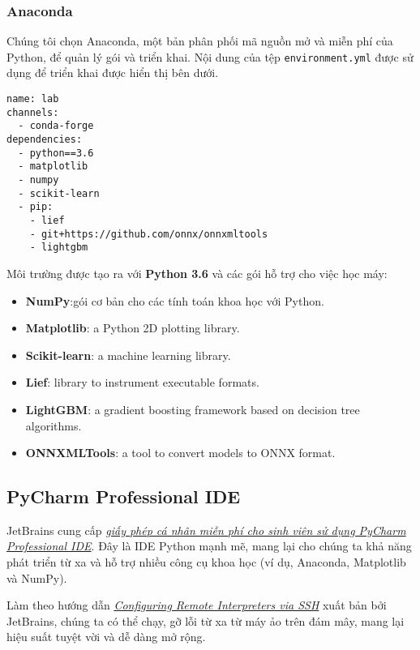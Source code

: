 \subsubsection{Anaconda}

Chúng tôi chọn Anaconda, một bản phân phối mã nguồn mở và miễn phí của Python, để quản lý gói và triển khai. Nội dung của tệp \verb|environment.yml| được sử dụng để triển khai được hiển thị bên dưới. 

\begin{lstlisting}
name: lab
channels:
  - conda-forge
dependencies:
  - python==3.6
  - matplotlib
  - numpy
  - scikit-learn
  - pip:
    - lief
    - git+https://github.com/onnx/onnxmltools
    - lightgbm
\end{lstlisting}

Môi trường được tạo ra với \textbf{Python 3.6} và các gói hỗ trợ cho việc học máy:

\begin{itemize}
\item \textbf{NumPy}:gói cơ bản cho các tính toán khoa học với Python.
\item \textbf{Matplotlib}: a Python 2D plotting library.
\item \textbf{Scikit-learn}: a machine learning library.
\item \textbf{Lief}: library to instrument executable formats.
\item \textbf{LightGBM}: a gradient boosting framework based on decision tree algorithms.
\item \textbf{ONNXMLTools}: a tool to convert models to ONNX format.
\end{itemize}

\subsection{PyCharm Professional IDE}

JetBrains cung cấp \textit{\href{https://www.jetbrains.com/student/}{giấy phép cá nhân miễn phí cho sinh viên sử dụng PyCharm Professional IDE}}.
Đây là IDE Python mạnh mẽ, mang lại cho chúng ta khả năng phát triển từ xa và hỗ trợ nhiều công cụ khoa học (ví dụ, Anaconda, Matplotlib và NumPy).

Làm theo hướng dẫn \textit{\href{https://www.jetbrains.com/help/pycharm/configuring-remote-interpreters-via-ssh.html}{Configuring Remote Interpreters via SSH}} xuất bản bởi JetBrains, chúng ta có thể chạy, gỡ lỗi từ xa từ máy ảo trên đám mây, mang lại hiệu suất tuyệt vời và dễ dàng mở rộng.